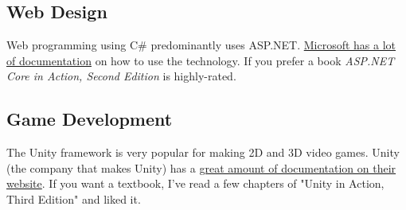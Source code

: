 \documentclass[oneside, openany] {book}
\begin{document}
\subsection{Web Design}
Web programming using C\# predominantly uses ASP.NET. \href{https://docs.microsoft.com/en-us/aspnet/core/?view=aspnetcore-6.0}{Microsoft has a lot of documentation} on how to use the technology. If you prefer a book \emph{ASP.NET Core in Action, Second Edition} is highly-rated.
\subsection{Game Development}
The Unity framework is very popular for making 2D and 3D video games. Unity (the company that makes Unity) has a \href{https://docs.unity.com/}{great amount of documentation on their website}. If you want a textbook, I've read a few chapters of "Unity in Action, Third Edition" and liked it.
\backmatter
\printindex
\end{document}
